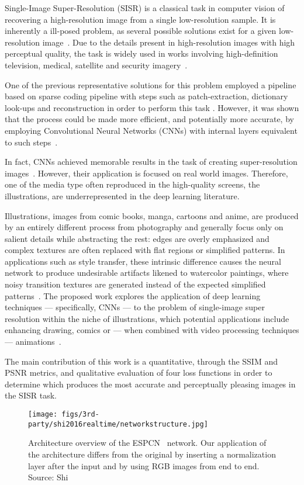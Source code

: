 Single-Image Super-Resolution (SISR) is a classical task in computer vision of recovering a high-resolution image from a single low-resolution sample. It is inherently a ill-posed problem, as several possible solutions exist for a given low-resolution image~\cite{dong2015image}.
Due to the details present in high-resolution images with high perceptual quality, the task is widely used in works involving high-definition television, medical, satellite and security imagery~\cite{shi2016realtime, yang2019deep}.

One of the previous representative solutions for this problem employed a pipeline based on sparse coding pipeline with steps such as patch-extraction, dictionary look-ups and reconstruction in order to perform this task \cite{yang2008image,yang2010image}. However, it was shown that the process could be made more efficient, and potentially more accurate, by employing Convolutional Neural Networks (CNNs) with internal layers equivalent to such steps~\cite{dong2015image}.

In fact, CNNs achieved memorable results in the task of creating super-resolution images~\cite{shi2016realtime, dong2015image, ledig2017photorealistic, lim2017enhanced}. However, their application is focused on real world images. Therefore, one of the media type often reproduced in the high-quality screens, the illustrations, are underrepresented in the deep learning literature.

Illustrations, \ie images from comic books, manga, cartoons and anime, are produced by an entirely different process from photography and generally focus only on salient details while abstracting the rest: edges are overly emphasized and complex textures are often replaced with flat regions or simplified patterns. In applications such as style transfer, these intrinsic difference causes the neural network to produce undesirable artifacts likened to watercolor paintings, where noisy transition textures are generated instead of the expected simplified patterns~\cite{danbooru2020}. The proposed work explores the application of deep learning techniques --- specifically, CNNs --- to the problem of single-image super resolution within the niche of illustrations, which potential applications include enhancing drawing, comics or --- when combined with video processing techniques --- animations~\cite{dandere2x}.

The main contribution of this work is a quantitative, through the SSIM and PSNR metrics, and qualitative evaluation of four loss functions in order to determine which produces the most accurate and perceptually pleasing images in the SISR task. 

\begin{figure*}[t]
  \texttt{[image: figs/3rd-party/shi2016realtime/networkstructure.jpg]}
  \caption{Architecture overview of the ESPCN~\cite{shi2016realtime} network. Our application of the architecture differs from the original by inserting a normalization layer after the input and by using RGB images from end to end. Source: Shi~\etal~\cite{shi2016realtime}}
  \label{figure:espcn}
\end{figure*}